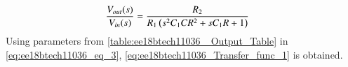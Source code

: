 \begin{enumerate}[label=\arabic*.,ref=\theenumi]
\begin{align}
    \frac{V_{out}(s)}{V_{in}(s)} &= \frac{R_2}{R_1\left(s^2C_1CR^2+sC_1R+1\right)} 
    \label{eq:ee18btech11036_eq_3}
\end{align}
Using parameters from \ref{table:ee18btech11036_ Output_Table} in 
\eqref{eq:ee18btech11036_eq_3}, \eqref{eq:ee18btech11036_Transfer_func_1} is obtained.


\end{enumerate}
